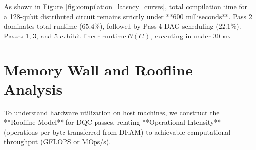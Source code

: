 As shown in Figure~\ref{fig:compilation_latency_curves}, total compilation time for a 128-qubit distributed circuit remains strictly under **$600\text{ milliseconds}$**. Pass 2 dominates total runtime ($65.4\%$), followed by Pass 4 DAG scheduling ($22.1\%$). Passes 1, 3, and 5 exhibit linear runtime $\mathcal{O}(G)$, executing in under $30\text{ ms}$.

\section{Memory Wall and Roofline Analysis}
\label{sec:roofline_model}

To understand hardware utilization on host machines, we construct the **Roofline Model** for DQC passes, relating **Operational Intensity** (operations per byte transferred from DRAM) to achievable computational throughput (GFLOPS or MOps/s).

